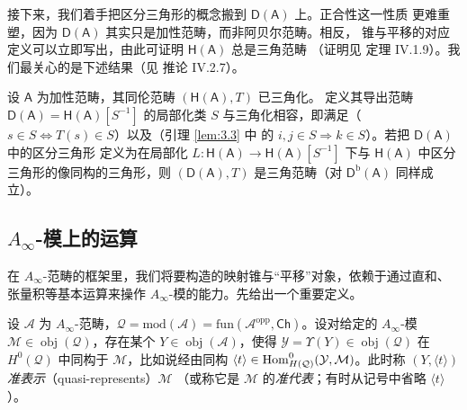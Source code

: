 接下来，我们着手把区分三角形的概念搬到 $\mathsf D(\mathsf A)$ 上。正合性这一性质
更难重塑，因为 $\mathsf D(\mathsf A)$ 其实只是加性范畴，而非阿贝尔范畴。相反，
锥与平移的对应定义可以立即写出，由此可证明 $\mathsf H(\mathsf A)$ 总是三角范畴
（证明见 \cite{GM03} 定理 IV.1.9）。我们最关心的是下述结果（见 \cite{GM03}
推论 IV.2.7）。

\begin{Thm}\label{thm:3.8}
设 $\mathsf A$ 为加性范畴，其同伦范畴 $(\mathsf H(\mathsf A),T)$ 已三角化。
定义其导出范畴 $\mathsf D(\mathsf A)=\mathsf H(\mathsf A)[S^{-1}]$ 的局部化类
$S$ 与三角化相容，即满足（$s\in S\iff T(s)\in S$）以及（引理 \ref{lem:3.3} 中
的 $i,j\in S\Rightarrow k\in S$）。若把 $\mathsf D(\mathsf A)$ 中的区分三角形
定义为在局部化 $L:\mathsf H(\mathsf A)\to\mathsf H(\mathsf A)[S^{-1}]$ 下与
$\mathsf H(\mathsf A)$ 中区分三角形的像同构的三角形，则 $(\mathsf D(\mathsf A),T)$
是三角范畴（对 $\mathsf D^{\mathrm b}(\mathsf A)$ 同样成立）。
\end{Thm}

\subsection{$A_\infty$-模上的运算}\label{sec:3.2}

在 $A_\infty$-范畴的框架里，我们将要构造的映射锥与“平移”对象，依赖于通过直和、
张量积等基本运算来操作 $A_\infty$-模的能力。先给出一个重要定义。

\begin{Def}\label{def:3.9}
设 $\mathcal A$ 为 $A_\infty$-范畴，$\mathcal Q=\mathrm{mod}(\mathcal A)
=\mathrm{fun}(\mathcal A^{\mathrm{opp}},\mathsf{Ch})$。设对给定的
$A_\infty$-模 $\mathcal M\in\operatorname{obj}(\mathcal Q)$，存在某个
$Y\in\operatorname{obj}(\mathcal A)$，使得
$\mathcal Y=\Upsilon(Y)\in\operatorname{obj}(\mathcal Q)$ 在 $H^0(\mathcal Q)$
中同构于 $\mathcal M$，比如说经由同构
$\langle t\rangle\in\operatorname{Hom}^0_{H(\mathcal Q)}(\mathcal Y,\mathcal M)$。此时称
$(Y,\langle t\rangle)$ \emph{准表示}（quasi-represents）$\mathcal M$
（或称它是 $\mathcal M$ 的\emph{准代表}；有时从记号中省略 $\langle t\rangle$）。
\end{Def}

